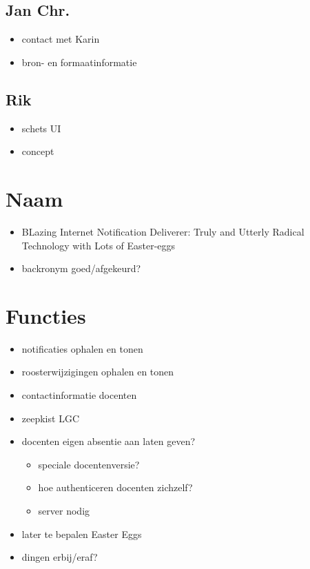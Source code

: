 \documentclass[a4paper, 10pt]{article}
\begin{document}
\subsection{Jan Chr.}
\begin{itemize}
	\item contact met Karin
	\item bron- en formaatinformatie
\end{itemize}

\subsection{Rik}
\begin{itemize}
	\item schets UI
	\item concept
\end{itemize}

\newpage
\section{Naam}
\begin{itemize}
	\item BLazing Internet Notification Deliverer: Truly and Utterly Radical
		Technology with Lots of Easter-eggs
	\item backronym goed/afgekeurd?
\end{itemize}

\section{Functies}
\begin{itemize}
	\item notificaties ophalen en tonen
	\item roosterwijzigingen ophalen en tonen
	\item contactinformatie docenten
	\item zeepkist LGC
	\item docenten eigen absentie aan laten geven?
	\begin{itemize}
		\item speciale docentenversie?
		\item hoe authenticeren docenten zichzelf?
		\item server nodig
	\end{itemize}
	\item later te bepalen Easter Eggs
	\item dingen erbij/eraf?
\end{itemize}
\end{document}
